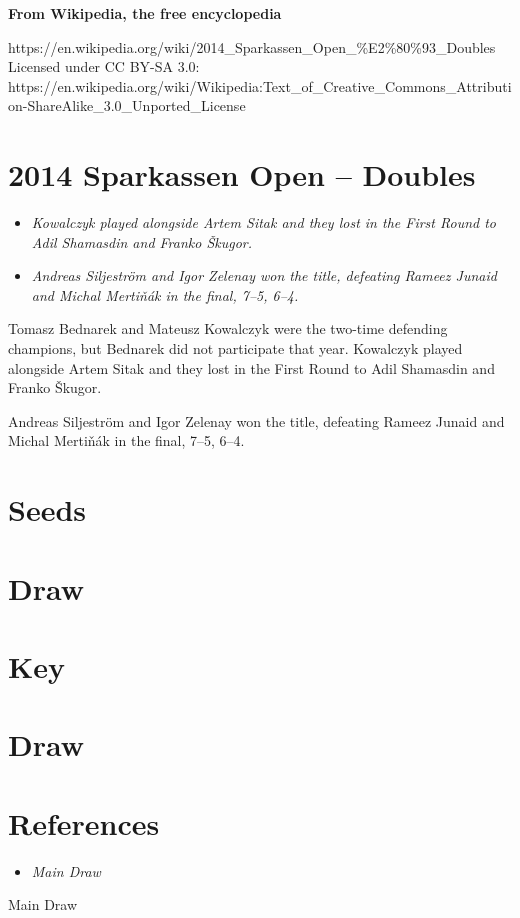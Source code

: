 \textbf{From Wikipedia, the free encyclopedia}

https://en.wikipedia.org/wiki/2014\_Sparkassen\_Open\_\%E2\%80\%93\_Doubles\\
Licensed under CC BY-SA 3.0:\\
https://en.wikipedia.org/wiki/Wikipedia:Text\_of\_Creative\_Commons\_Attribution-ShareAlike\_3.0\_Unported\_License

\section{2014 Sparkassen Open -- Doubles}\label{sparkassen-open-doubles}

\begin{itemize}
\item
  \emph{Kowalczyk played alongside Artem Sitak and they lost in the
  First Round to Adil Shamasdin and Franko Škugor.}
\item
  \emph{Andreas Siljeström and Igor Zelenay won the title, defeating
  Rameez Junaid and Michal Mertiňák in the final, 7--5, 6--4.}
\end{itemize}

Tomasz Bednarek and Mateusz Kowalczyk were the two-time defending
champions, but Bednarek did not participate that year. Kowalczyk played
alongside Artem Sitak and they lost in the First Round to Adil Shamasdin
and Franko Škugor.

Andreas Siljeström and Igor Zelenay won the title, defeating Rameez
Junaid and Michal Mertiňák in the final, 7--5, 6--4.

\section{Seeds}\label{seeds}

\section{Draw}\label{draw}

\section{Key}\label{key}

\section{Draw}\label{draw-1}

\section{References}\label{references}

\begin{itemize}
\item
  \emph{Main Draw}
\end{itemize}

Main Draw
